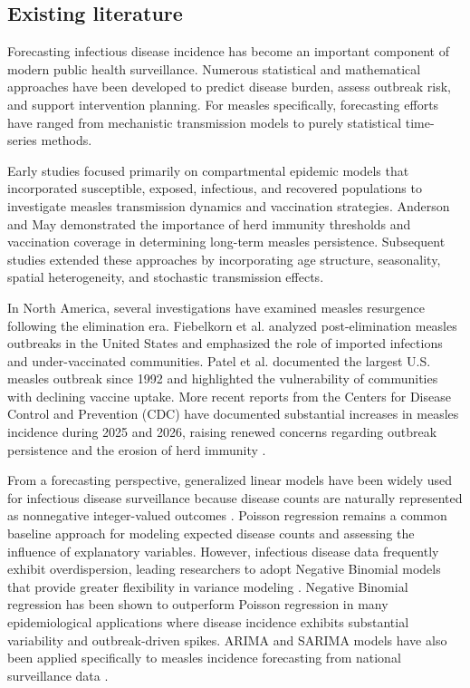 \documentclass[utf8]{FrontiersinHarvard} %
\begin{document}
\subsection{Existing literature}
Forecasting infectious disease incidence has become an important component of modern public health surveillance. Numerous statistical and mathematical approaches have been developed to predict disease burden, assess outbreak risk, and support intervention planning. For measles specifically, forecasting efforts have ranged from mechanistic transmission models to purely statistical time-series methods.

Early studies focused primarily on compartmental epidemic models that incorporated susceptible, exposed, infectious, and recovered populations to investigate measles transmission dynamics and vaccination strategies. Anderson and May \cite{anderson1991} demonstrated the importance of herd immunity thresholds and vaccination coverage in determining long-term measles persistence. Subsequent studies extended these approaches by incorporating age structure, seasonality, spatial heterogeneity, and stochastic transmission effects.

In North America, several investigations have examined measles resurgence following the elimination era. Fiebelkorn et al. \cite{fiebelkorn2010postelimination} analyzed post-elimination measles outbreaks in the United States and emphasized the role of imported infections and under-vaccinated communities. Patel et al. \cite{patel2019} documented the largest U.S. measles outbreak since 1992 and highlighted the vulnerability of communities with declining vaccine uptake. More recent reports from the Centers for Disease Control and Prevention (CDC) have documented substantial increases in measles incidence during 2025 and 2026, raising renewed concerns regarding outbreak persistence and the erosion of herd immunity \cite{mathis2025measles,cdc2026cases}.

From a forecasting perspective, generalized linear models have been widely used for infectious disease surveillance because disease counts are naturally represented as nonnegative integer-valued outcomes \cite{mccullagh1989glm}. Poisson regression remains a common baseline approach for modeling expected disease counts and assessing the influence of explanatory variables. However, infectious disease data frequently exhibit overdispersion, leading researchers to adopt Negative Binomial models that provide greater flexibility in variance modeling \cite{hilbe2011}. Negative Binomial regression has been shown to outperform Poisson regression in many epidemiological applications where disease incidence exhibits substantial variability and outbreak-driven spikes. ARIMA and SARIMA models have also been applied specifically to measles
incidence forecasting from national surveillance data
\citep{ojasanya2025measles}.
\end{document}
